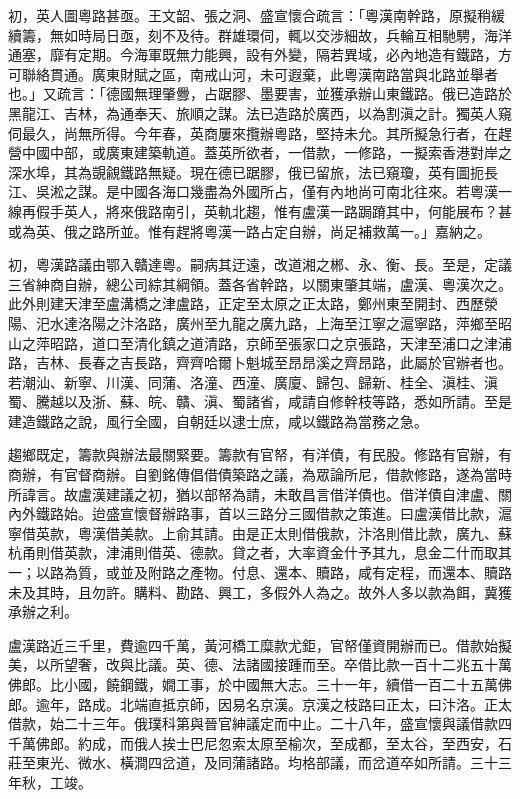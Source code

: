 \begin{pinyinscope}
初，英人圖粵路甚亟。王文韶、張之洞、盛宣懷合疏言：「粵漢南幹路，原擬稍緩續籌，無如時局日亟，刻不及待。群雄環伺，輒以交涉細故，兵輪互相馳騁，海洋通塞，靡有定期。今海軍既無力能興，設有外變，隔若異域，必內地造有鐵路，方可聯絡貫通。廣東財賦之區，南戒山河，未可遐棄，此粵漢南路當與北路並舉者也。」又疏言：「德國無理肇釁，占踞膠、墨要害，並獲承辦山東鐵路。俄已造路於黑龍江、吉林，為通奉天、旅順之謀。法已造路於廣西，以為割滇之計。獨英人窺伺最久，尚無所得。今年春，英商屢來攬辦粵路，堅持未允。其所擬急行者，在趕營中國中部，或廣東建築軌道。蓋英所欲者，一借款，一修路，一擬索香港對岸之深水埠，其為覬覦鐵路無疑。現在德已踞膠，俄已留旅，法已窺瓊，英有圖扼長江、吳淞之謀。是中國各海口幾盡為外國所占，僅有內地尚可南北往來。若粵漢一線再假手英人，將來俄路南引，英軌北趨，惟有盧漢一路跼蹐其中，何能展布？甚或為英、俄之路所並。惟有趕將粵漢一路占定自辦，尚足補救萬一。」嘉納之。

初，粵漢路議由鄂入贛達粵。嗣病其迂遠，改道湘之郴、永、衡、長。至是，定議三省紳商自辦，總公司綜其綱領。蓋各省幹路，以關東肇其端，盧漢、粵漢次之。此外則建天津至盧溝橋之津盧路，正定至太原之正太路，鄭州東至開封、西歷滎陽、汜水達洛陽之汴洛路，廣州至九龍之廣九路，上海至江寧之滬寧路，萍鄉至昭山之萍昭路，道口至清化鎮之道清路，京師至張家口之京張路，天津至浦口之津浦路，吉林、長春之吉長路，齊齊哈爾卜魁城至昂昂溪之齊昂路，此屬於官辦者也。若潮汕、新寧、川漢、同蒲、洛潼、西潼、廣廈、歸包、歸新、桂全、滇桂、滇蜀、騰越以及浙、蘇、皖、贛、滇、蜀諸省，咸請自修幹枝等路，悉如所請。至是建造鐵路之說，風行全國，自朝廷以逮士庶，咸以鐵路為當務之急。

趨鄉既定，籌款與辦法最關緊要。籌款有官帑，有洋債，有民股。修路有官辦，有商辦，有官督商辦。自劉銘傳倡借債築路之議，為眾論所尼，借款修路，遂為當時所諱言。故盧漢建議之初，猶以部帑為請，未敢昌言借洋債也。借洋債自津盧、關內外鐵路始。迨盛宣懷督辦路事，首以三路分三國借款之策進。曰盧漢借比款，滬寧借英款，粵漢借美款。上俞其請。由是正太則借俄款，汴洛則借比款，廣九、蘇杭甬則借英款，津浦則借英、德款。貸之者，大率資金什予其九，息金二什而取其一；以路為質，或並及附路之產物。付息、還本、贖路，咸有定程，而還本、贖路未及其時，且勿許。購料、勘路、興工，多假外人為之。故外人多以款為餌，冀獲承辦之利。

盧漢路近三千里，費逾四千萬，黃河橋工糜款尤鉅，官帑僅資開辦而已。借款始擬美，以所望奢，改與比議。英、德、法諸國接踵而至。卒借比款一百十二兆五十萬佛郎。比小國，饒鋼鐵，嫺工事，於中國無大志。三十一年，續借一百二十五萬佛郎。逾年，路成。北端直抵京師，因易名京漢。京漢之枝路曰正太，曰汴洛。正太借款，始二十三年。俄璞科第與晉官紳議定而中止。二十八年，盛宣懷與議借款四千萬佛郎。約成，而俄人挨士巴尼忽索太原至榆次，至成都，至太谷，至西安，石莊至東光、微水、橫澗四岔道，及同蒲諸路。均格部議，而岔道卒如所請。三十三年秋，工竣。


\end{pinyinscope}
